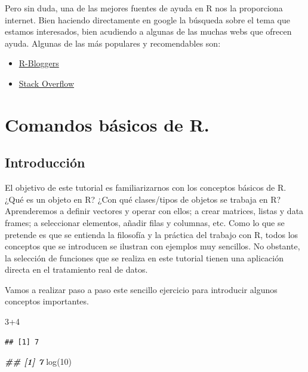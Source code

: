 \documentclass[
]{book}
\newenvironment{Shaded}{\begin{snugshade}}{\end{snugshade}}
\newcommand{\DecValTok}[1]{\textcolor[rgb]{0.00,0.00,0.81}{#1}}
\newcommand{\DocumentationTok}[1]{\textcolor[rgb]{0.56,0.35,0.01}{\textbf{\textit{#1}}}}
\newcommand{\FunctionTok}[1]{\textcolor[rgb]{0.00,0.00,0.00}{#1}}
\newcommand{\NormalTok}[1]{#1}
\newcommand{\SpecialCharTok}[1]{\textcolor[rgb]{0.00,0.00,0.00}{#1}}
\begin{document}
Pero sin duda, una de las mejores fuentes de ayuda en R nos la proporciona internet. Bien haciendo directamente en google la búsqueda sobre el tema que estamos interesados, bien acudiendo a algunas de las muchas webs que ofrecen ayuda. Algunas de las más populares y recomendables son:

\begin{itemize}
\item
  \href{https://www.r-bloggers.com/}{R-Bloggers}
\item
  \href{https://stackoverflow.com/}{Stack Overflow}
\end{itemize}

\hypertarget{comandos-buxe1sicos-de-r.}{%
\chapter{Comandos básicos de R.}\label{comandos-buxe1sicos-de-r.}}

\hypertarget{introducciuxf3n}{%
\section{Introducción}\label{introducciuxf3n}}

El objetivo de este tutorial es familiarizarnos con los conceptos básicos de R. ¿Qué es un objeto en R? ¿Con qué clases/tipos de objetos se trabaja en R?
Aprenderemos a definir vectores y operar con ellos; a crear matrices, listas y data frames; a seleccionar elementos, añadir filas y columnas, etc. Como lo que se pretende es que se entienda la filosofía y la práctica del trabajo con R, todos los conceptos que se introducen se ilustran con ejemplos muy sencillos. No obstante, la selección de funciones que se realiza en este tutorial tienen una aplicación directa en el tratamiento real de datos.

Vamos a realizar paso a paso este sencillo ejercicio para introducir algunos conceptos importantes.

\begin{Shaded}
\begin{Highlighting}[]
\DecValTok{3}\SpecialCharTok{+}\DecValTok{4}
\end{Highlighting}
\end{Shaded}

\begin{verbatim}
## [1] 7
\end{verbatim}

\begin{Shaded}
\begin{Highlighting}[]
\DocumentationTok{\#\# [1] 7}
\FunctionTok{log}\NormalTok{(}\DecValTok{10}\NormalTok{)}
\end{Highlighting}
\end{Shaded}
\end{document}
